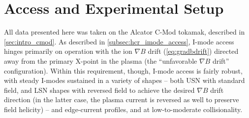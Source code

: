 \section{Access and Experimental Setup}\label{sec:imode_setup}

All data presented here was taken on the Alcator C-Mod tokamak, described in \cref{sec:intro_cmod}.  As described in \cref{subsec:hcr_imode_access}, I-mode access hinges primarily on operation with the ion $\nabla B$ drift (\cref{eq:gradbdrift}) directed away from the primary X-point in the plasma (the ``unfavorable $\nabla B$ drift'' configuration).  Within this requirement, though, I-mode access is fairly robust, with steady I-modes sustained in a variety of shapes -- both USN with standard field, and LSN shapes with reversed field to achieve the desired $\nabla B$ drift direction (in the latter case, the plasma current is reversed as well to preserve field helicity) -- and edge-current profiles, and at low-to-moderate collisionality.

\begin{figure}[h]
 \pushtooutside
\end{figure}



